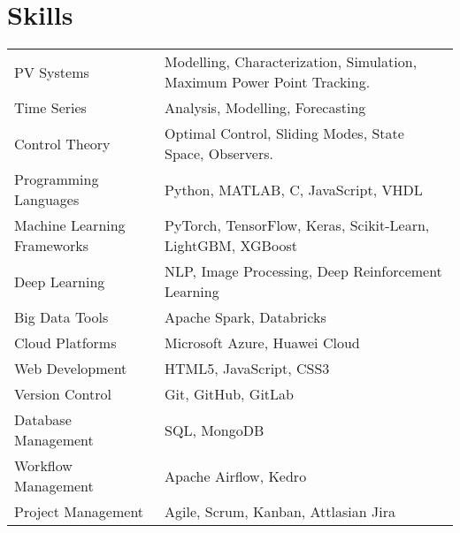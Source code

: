 \documentclass[a4paper,10pt]{article}
\begin{document}
\section{Skills}
\begin{tabularx}{\linewidth}{@{}l X@{}}
PV Systems & Modelling, Characterization, Simulation, Maximum Power Point Tracking.\\
Time Series & Analysis, Modelling, Forecasting\\
Control Theory & Optimal Control, Sliding Modes, State Space, Observers.\\
Programming Languages & Python, MATLAB, C, JavaScript, VHDL\\
Machine Learning Frameworks & PyTorch, TensorFlow, Keras, Scikit-Learn, LightGBM, XGBoost\\
Deep Learning & NLP, Image Processing, Deep Reinforcement Learning\\
Big Data Tools & Apache Spark, Databricks\\
Cloud Platforms & Microsoft Azure, Huawei Cloud\\
Web Development & HTML5, JavaScript, CSS3\\
Version Control & Git, GitHub, GitLab\\
Database Management & SQL, MongoDB\\
Workflow Management & Apache Airflow, Kedro\\
Project Management & Agile, Scrum, Kanban, Attlasian Jira\\
\end{tabularx}



\end{document}
